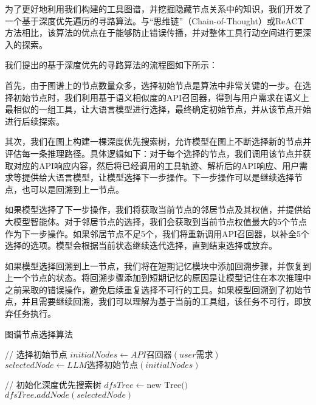 为了更好地利用我们构建的工具图谱，并挖掘隐藏节点关系中的知识，我们开发了一个基于深度优先遍历的寻路算法。与“思维链”（Chain-of-Thought）或ReACT方法相比，该算法的优点在于能够防止错误传播，并对整体工具行动空间进行更深入的探索。

我们提出的基于深度优先的寻路算法的流程图如下所示：

首先，由于图谱上的节点数量众多，选择初始节点是算法中非常关键的一步。在选择初始节点时，我们利用基于语义相似度的API召回器，得到与用户需求在语义上最相似的一组工具，让大语言模型进行选择，最终确定初始节点，并从该节点开始进行后续探索。

其次，我们在图上构建一棵深度优先搜索树，允许模型在图上不断选择新的节点并评估每一条推理路径。具体逻辑如下：对于每个选择的节点，我们调用该节点并获取对应的API响应内容，然后将已经调用的工具轨迹、解析后的API响应、用户需求等提供给大语言模型，让模型选择下一步操作。下一步操作可以是继续选择节点，也可以是回溯到上一节点。

如果模型选择了下一步操作，我们将获取当前节点的邻居节点及其权值，并提供给大模型智能体。对于邻居节点的选择，我们会获取到当前节点权值最大的5个节点作为下一步操作。如果邻居节点不足5个，我们将重新调用API召回器，以补全5个选择的选项。模型会根据当前状态继续迭代选择，直到结束选择或放弃。

如果模型选择回溯到上一节点，我们将在短期记忆模块中添加回溯步骤，并恢复到上一个节点的状态。将回溯步骤添加到短期记忆的原因是让模型记住在本次推理中之前采取的错误操作，避免后续重复选择不可行的工具。如果模型回溯到了初始节点，并且需要继续回溯，我们可以理解为基于当前的工具组，该任务不可行，即放弃任务执行。

\begin{algorithm}[htb]
    \caption{图谱节点选择算法}
    \label{algo:algorithm}
    \small
    \SetAlgoLined
  
    // 选择初始节点\;
    $initi
    alNodes \gets API召回器(user需求)$\;
    $selectedNode \gets LLM选择初始节点(initialNodes)$\;
    
    // 初始化深度优先搜索树\;
    $dfsTree \gets \text{new Tree()}$\;
    $dfsTree.addNode(selectedNode)$\;
  
  \end{algorithm}

